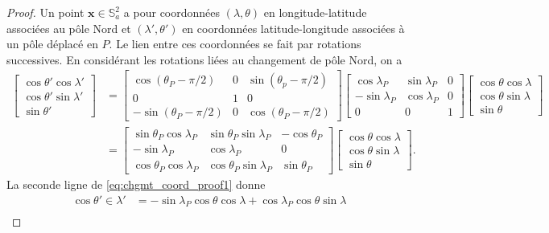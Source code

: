 \begin{proof}
Un point $\mathbf{x} \in \mathbb{S}_a^2$ a pour coordonnées $(\lambda, \theta)$ en longitude-latitude associées au pôle Nord et $(\lambda', \theta')$ en coordonnées latitude-longitude associées à un pôle déplacé en $P$. Le lien entre ces coordonnées se fait par rotations successives.
En considérant les rotations liées au changement de pôle Nord, on a
\begin{align}
\begin{bmatrix}
\cos \theta' \cos \lambda' \\ \cos \theta' \sin \lambda' \\ \sin \theta'
\end{bmatrix} & = 
\begin{bmatrix}
\cos (\theta_P - \pi/2) & 0 & \sin (\theta_p - \pi/2) \\
0 & 1 & 0 \\
- \sin (\theta_P - \pi/2 ) & 0 & \cos (\theta_P - \pi/2)
\end{bmatrix}
\begin{bmatrix}
\cos \lambda_P & \sin \lambda_P & 0 \\
- \sin \lambda_P & \cos \lambda_P & 0 \\
0 & 0 & 1 
\end{bmatrix}
\begin{bmatrix}
\cos \theta \cos \lambda \\ \cos \theta \sin \lambda \\ \sin \theta
\end{bmatrix} \\
& = \begin{bmatrix}
\sin \theta_P \cos \lambda_P & \sin \theta_P \sin \lambda_P & - \cos \theta_P \\
- \sin \lambda_P & \cos \lambda_P & 0 \\
\cos \theta_P \cos \lambda_P & \cos \theta_P \sin \lambda_P & \sin \theta_P
\end{bmatrix}
\begin{bmatrix}
\cos \theta \cos \lambda \\ \cos \theta \sin \lambda \\ \sin \theta
\end{bmatrix}.
\label{eq:chgmt_coord_proof1}
\end{align}
La seconde ligne de \eqref{eq:chgmt_coord_proof1} donne
\begin{align*}
\cos \theta' \in \lambda'  & = - \sin \lambda_P \cos \theta \cos \lambda + \cos \lambda_P \cos \theta \sin \lambda \\

\end{align*}
\end{proof}
